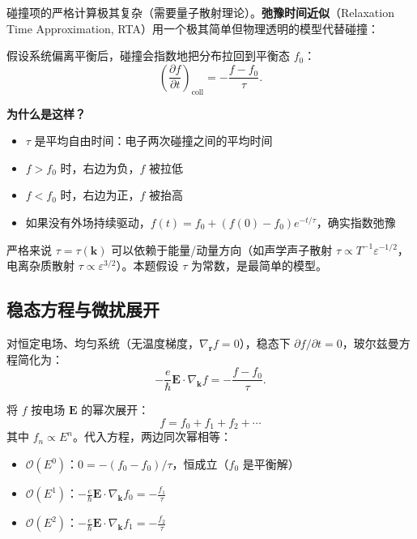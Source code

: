 碰撞项的严格计算极其复杂（需要量子散射理论）。\textbf{弛豫时间近似}（Relaxation Time Approximation, RTA）用一个极其简单但物理透明的模型代替碰撞：

\begin{derivationbox}[弛豫时间近似的物理图像]
假设系统偏离平衡后，碰撞会指数地把分布拉回到平衡态 $f_0$：
\[
\left(\frac{\partial f}{\partial t}\right)_{\!\text{coll}} = -\frac{f - f_0}{\tau}.
\]

\textbf{为什么是这样？}
\begin{itemize}
    \item $\tau$ 是平均自由时间：电子两次碰撞之间的平均时间
    \item $f > f_0$ 时，右边为负，$f$ 被拉低
    \item $f < f_0$ 时，右边为正，$f$ 被抬高
    \item 如果没有外场持续驱动，$f(t) = f_0 + (f(0) - f_0)e^{-t/\tau}$，确实指数弛豫
\end{itemize}
\end{derivationbox}

\begin{warnbox}[注意]
严格来说 $\tau = \tau(\bm{k})$ 可以依赖于能量/动量方向（如声学声子散射 $\tau \propto T^{-1}\varepsilon^{-1/2}$，电离杂质散射 $\tau \propto \varepsilon^{3/2}$）。本题假设 $\tau$ 为常数，是最简单的模型。
\end{warnbox}

\subsection{稳态方程与微扰展开}

\begin{derivationbox}[稳态方程与微扰展开]
对恒定电场、均匀系统（无温度梯度，$\nabla_{\!\bm{r}}f = 0$），稳态下 $\partial f/\partial t = 0$，玻尔兹曼方程简化为：
\[
-\frac{e}{\hbar}\bm{E} \cdot \nabla_{\!\bm{k}}f = -\frac{f - f_0}{\tau}.
\]

将 $f$ 按电场 $\bm{E}$ 的幂次展开：
\[
f = f_0 + f_1 + f_2 + \cdots
\]
其中 $f_n \propto E^n$。代入方程，两边同次幂相等：
\begin{itemize}
    \item $\mathcal{O}(E^0)$：$0 = -(f_0 - f_0)/\tau$，恒成立（$f_0$ 是平衡解）
    \item $\mathcal{O}(E^1)$：$\displaystyle -\frac{e}{\hbar}\bm{E} \cdot \nabla_{\!\bm{k}}f_0 = -\frac{f_1}{\tau}$
    \item $\mathcal{O}(E^2)$：$\displaystyle -\frac{e}{\hbar}\bm{E} \cdot \nabla_{\!\bm{k}}f_1 = -\frac{f_2}{\tau}$
\end{itemize}
\end{derivationbox}

